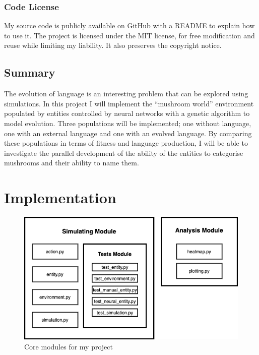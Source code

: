 \documentclass[12pt,a4paper,twoside,openright]{report}
\begin{document}
\subsection{Code License}

My source code is publicly available on GitHub with a README to explain how to use it. The project is licensed under the MIT license, for free modification and reuse while limiting my liability. It also preserves the copyright notice.

\section{Summary}\label{section:summary}

The evolution of language is an interesting problem that can be explored using simulations. In this project I will implement the ``mushroom world'' environment populated by entities controlled by neural networks with a genetic algorithm to model evolution. Three populations will be implemented; one without language, one with an external language and one with an evolved language. By comparing these populations in terms of fitness and language production, I will be able to investigate the parallel development of the ability of the entities to categorise mushrooms and their ability to name them.


\chapter{Implementation}


\begin{figure}[t]
  \centering
  \includegraphics[width=.8\linewidth]{figs/modules}
  \caption{Core modules for my project}
  \label{fig:modules}
\end{figure}
\end{document}

